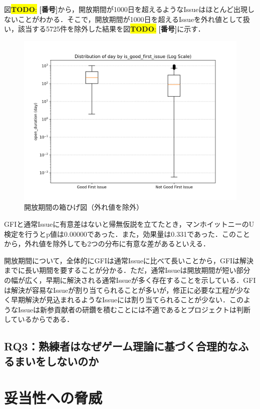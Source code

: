 \documentclass[11pt]{jreport}
\newcommand{\todo}[1]{\colorbox{yellow}{{\bf TODO}:}{\color{red} {\textbf{[#1]}}}}
\begin{document}
図\todo{番号}から，開放期間が1000日を超えるようなIssueはほとんど出現しないことがわかる．そこで，開放期間が1000日を超えるIssueを外れ値として扱い，該当する5725件を除外した結果を図\todo{番号}に示す．

\begin{figure}[t]
\centerline{\includegraphics[width=0.9\linewidth]{@BSthesis2024_Nakai/BSthesis2024_Nakai_fig/true_time_box.png}}
\caption{開放期間の箱ひげ図（外れ値を除外）}
\label{fig:milestone}
\end{figure}

GFIと通常Issueに有意差はないと帰無仮説を立てたとき，マンホイットニーのU検定を行うとp値は0.00000であった．また，効果量は0.331であった．このことから，外れ値を除外しても2つの分布に有意な差があるといえる．

開放期間について，全体的にGFIは通常Issueに比べて長いことから，GFIは解決までに長い期間を要することが分かる．ただ，通常Issueは開放期間が短い部分の幅が広く，早期に解決される通常Issueが多く存在することを示している．GFIは解決が容易なIssueが割り当てられることが多いが，修正に必要な工程が少なく早期解決が見込まれるようなIssueには割り当てられることが少ない．このようなIssueは新参貢献者の研鑽を積むことには不適であるとプロジェクトは判断しているからである．

\subsection{RQ3：熟練者はなぜゲーム理論に基づく合理的なふるまいをしないのか }

\section{妥当性への脅威}
\end{document}
